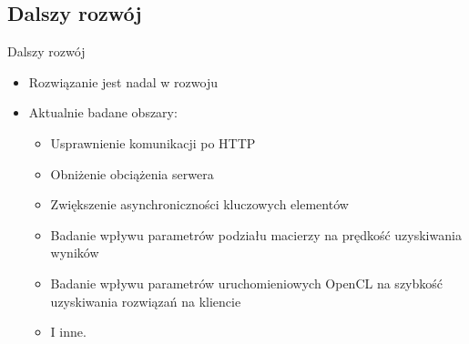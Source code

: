 \documentclass[12pt]{beamer}
\begin{document}
\subsection{Dalszy rozwój}
\begin{frame}{Dalszy rozwój}
\begin{itemize}
	\item Rozwiązanie jest nadal w rozwoju
	\item Aktualnie badane obszary:
	\begin{itemize}
		\item Usprawnienie komunikacji po HTTP
		\item Obniżenie obciążenia serwera
		\item Zwiększenie asynchroniczności kluczowych elementów
		\item Badanie wpływu parametrów podziału macierzy na prędkość uzyskiwania wyników
		\item Badanie wpływu parametrów uruchomieniowych OpenCL na szybkość uzyskiwania rozwiązań na kliencie
		\item I inne.
	\end{itemize}
\end{itemize}
\end{frame}
\end{document}
